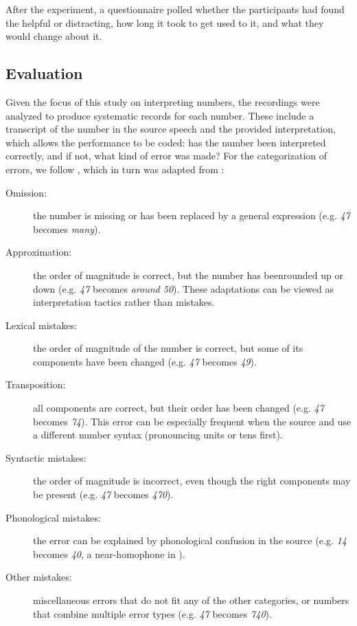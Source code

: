 \documentclass[output=paper]{langsci/langscibook}
\begin{document}
After the experiment, a questionnaire polled whether the participants had found the  helpful or distracting, how long it took to get used to it, and what they would change about it.

\subsection{Evaluation}
Given the focus of this study on interpreting numbers, the recordings were analyzed to produce systematic records for each number. These include a transcript of the number  in the source speech and the provided interpretation, which allows the performance to be coded: has the number been interpreted correctly, and if not, what kind of error was made? For the categorization of errors, we follow \citet{Pinochi2009}, which in turn was adapted from \citet{Braun1996}:

\begin{description}
\item[Omission:] the number is missing or has been replaced by a general expression (e.g. \textit{47} becomes \textit{many}).
\item[Approximation:] the order of magnitude is correct, but the number has been\linebreak rounded up or down (e.g. \textit{47} becomes \textit{around 50}). These adaptations can be viewed as interpretation tactics rather than mistakes.
\item[Lexical mistakes:] the order of magnitude of the number is correct, but some of its components have been changed (e.g. \textit{47} becomes \textit{49}).
\item[Transposition:] all components are correct, but their order has been changed (e.g. \textit{47} becomes \textit{74}). This error can be especially frequent when the source and  use a different number syntax (pronouncing units or tens first).
\item[Syntactic mistakes:] the order of magnitude is incorrect, even though the right components may be present (e.g. \textit{47} becomes \textit{470}).
\item[Phonological mistakes:] the error can be explained by phonological confusion in the source  (e.g. \textit{14} becomes \textit{40}, a near-homophone in ).
\item[Other mistakes:] miscellaneous errors that do not fit any of the other categories, or numbers that combine multiple error types (e.g. \textit{47} becomes \textit{740}).
\end{description}
\end{document}
